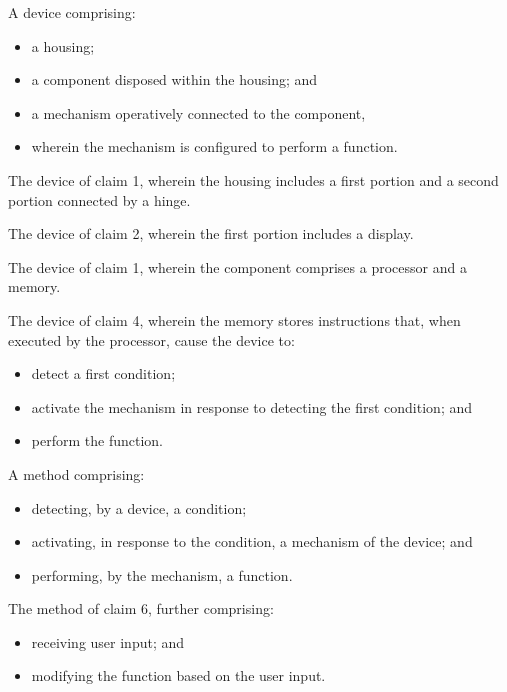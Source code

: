 \documentclass[12pt,letterpaper]{article}
\begin{document}
\begin{patentclaims}
    \item A device comprising:
    \begin{itemize}[leftmargin=2em]
        \item a housing;
        \item a component disposed within the housing; and
        \item a mechanism operatively connected to the component,
        \item wherein the mechanism is configured to perform a function.
    \end{itemize}
    
    \item The device of claim 1, wherein the housing includes a first portion and a second portion connected by a hinge.
    
    \item The device of claim 2, wherein the first portion includes a display.
    
    \item The device of claim 1, wherein the component comprises a processor and a memory.
    
    \item The device of claim 4, wherein the memory stores instructions that, when executed by the processor, cause the device to:
    \begin{itemize}[leftmargin=2em]
        \item detect a first condition;
        \item activate the mechanism in response to detecting the first condition; and
        \item perform the function.
    \end{itemize}
    
    \item A method comprising:
    \begin{itemize}[leftmargin=2em]
        \item detecting, by a device, a condition;
        \item activating, in response to the condition, a mechanism of the device; and
        \item performing, by the mechanism, a function.
    \end{itemize}
    
    \item The method of claim 6, further comprising:
    \begin{itemize}[leftmargin=2em]
        \item receiving user input; and
        \item modifying the function based on the user input.
    \end{itemize}
\end{patentclaims}
\end{document}
